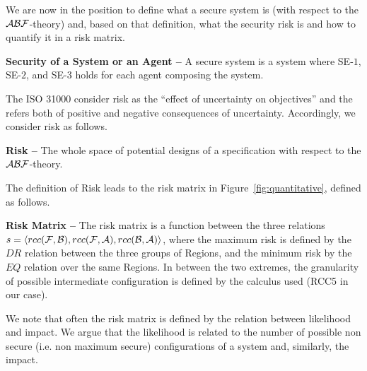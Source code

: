 We are now in the position to define what a secure system is (with respect to the $\mathcal{A}\mathcal{B}\mathcal{F}$-theory) 
and, based on that definition, what the security risk is and how to quantify it in a risk matrix.
\begin{definition}{\bf Security of a System or an Agent --}\label{def:security}
	A secure system is a system where SE-$1$, SE-$2$, and SE-$3$ holds for each 
	agent composing the system.
\end{definition}
The ISO 31000 consider risk as the ``effect of uncertainty on objectives'' and the refers
both of positive and negative consequences of uncertainty. Accordingly, we consider
risk as follows. 
\begin{definition}{\bf Risk --}
The whole space of potential designs of a specification with respect to the
$\mathcal{A}\mathcal{B}\mathcal{F}$-theory.
\end{definition}
The definition of Risk leads to the risk matrix in Figure~\ref{fig:quantitative}, defined as follows.
\begin{definition}{\bf Risk Matrix --}
	The risk matrix is a function between the three relations 
	$s=\langle rcc(\mathcal{F},\mathcal{B}),rcc(\mathcal{F},\mathcal{A}),rcc(\mathcal{B},\mathcal{A})\rangle$,
	where the maximum risk is defined by the $DR$ relation between the three groups of Regions, and the 
	minimum risk by the $EQ$ relation over the same Regions. In between the two extremes, the granularity
	of possible intermediate configuration is defined by the calculus used (RCC5 in our case).
\end{definition}
We note that often the risk matrix is defined by the relation between likelihood and impact.
We argue that the likelihood is related to the number of possible non secure (i.e. non maximum secure) 
configurations of a system and, similarly, the impact.

